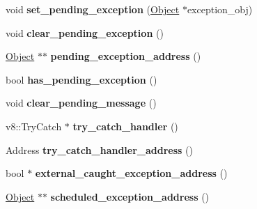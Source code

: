\begin{DoxyCompactItemize}
\item 
\hypertarget{classv8_1_1internal_1_1_isolate_ac42c972c4add5fdd2c3825cd83c67c42}{}void {\bfseries set\+\_\+pending\+\_\+exception} (\hyperlink{classv8_1_1internal_1_1_object}{Object} $\ast$exception\+\_\+obj)\label{classv8_1_1internal_1_1_isolate_ac42c972c4add5fdd2c3825cd83c67c42}

\item 
\hypertarget{classv8_1_1internal_1_1_isolate_ad3c825b0f46231c518ff0cbe9ef881d4}{}void {\bfseries clear\+\_\+pending\+\_\+exception} ()\label{classv8_1_1internal_1_1_isolate_ad3c825b0f46231c518ff0cbe9ef881d4}

\item 
\hypertarget{classv8_1_1internal_1_1_isolate_a3bcdd8ce6d52a125d52990d0fb81720b}{}\hyperlink{classv8_1_1internal_1_1_object}{Object} $\ast$$\ast$ {\bfseries pending\+\_\+exception\+\_\+address} ()\label{classv8_1_1internal_1_1_isolate_a3bcdd8ce6d52a125d52990d0fb81720b}

\item 
\hypertarget{classv8_1_1internal_1_1_isolate_afe40737e38f3a1af7bb7612e92c6c96f}{}bool {\bfseries has\+\_\+pending\+\_\+exception} ()\label{classv8_1_1internal_1_1_isolate_afe40737e38f3a1af7bb7612e92c6c96f}

\item 
\hypertarget{classv8_1_1internal_1_1_isolate_a3a2335d0d26d156ce3153e1237fd4075}{}void {\bfseries clear\+\_\+pending\+\_\+message} ()\label{classv8_1_1internal_1_1_isolate_a3a2335d0d26d156ce3153e1237fd4075}

\item 
\hypertarget{classv8_1_1internal_1_1_isolate_a94a97108717e97fa3c032710ca045bdf}{}v8\+::\+Try\+Catch $\ast$ {\bfseries try\+\_\+catch\+\_\+handler} ()\label{classv8_1_1internal_1_1_isolate_a94a97108717e97fa3c032710ca045bdf}

\item 
\hypertarget{classv8_1_1internal_1_1_isolate_abcf5e629e58a671b1f99d0a5fdaa1add}{}Address {\bfseries try\+\_\+catch\+\_\+handler\+\_\+address} ()\label{classv8_1_1internal_1_1_isolate_abcf5e629e58a671b1f99d0a5fdaa1add}

\item 
\hypertarget{classv8_1_1internal_1_1_isolate_a4cf9e1bfbe97317423eb10ed07dab043}{}bool $\ast$ {\bfseries external\+\_\+caught\+\_\+exception\+\_\+address} ()\label{classv8_1_1internal_1_1_isolate_a4cf9e1bfbe97317423eb10ed07dab043}

\item 
\hypertarget{classv8_1_1internal_1_1_isolate_a35ba7fb202b5e53f3dcfd73a7c16e0b6}{}\hyperlink{classv8_1_1internal_1_1_object}{Object} $\ast$$\ast$ {\bfseries scheduled\+\_\+exception\+\_\+address} ()\label{classv8_1_1internal_1_1_isolate_a35ba7fb202b5e53f3dcfd73a7c16e0b6}


\end{DoxyCompactItemize}
